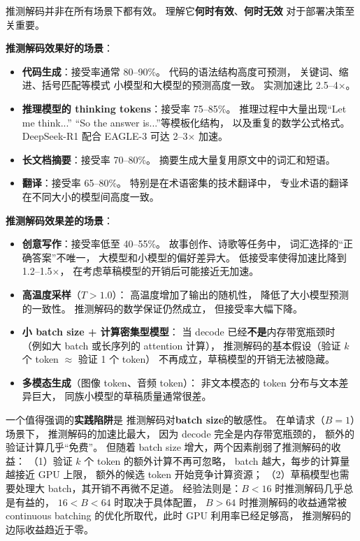 推测解码并非在所有场景下都有效。
理解它\textbf{何时有效}、\textbf{何时无效}
对于部署决策至关重要。

\textbf{推测解码效果好的场景}：
\begin{itemize}[noitemsep]
  \item \textbf{代码生成}：接受率通常 80--90\%。
        代码的语法结构高度可预测，
        关键词、缩进、括号匹配等模式
        小模型和大模型的预测高度一致。
        实测加速比 2.5--4$\times$。
  \item \textbf{推理模型的 thinking tokens}：接受率 75--85\%。
        推理过程中大量出现“Let me think...”
        “So the answer is...”等模板化结构，
        以及重复的数学公式格式。
        DeepSeek-R1 配合 EAGLE-3 可达 2--3$\times$ 加速。
  \item \textbf{长文档摘要}：接受率 70--80\%。
        摘要生成大量复用原文中的词汇和短语。
  \item \textbf{翻译}：接受率 65--80\%。
        特别是在术语密集的技术翻译中，
        专业术语的翻译在不同大小的模型间高度一致。
\end{itemize}

\textbf{推测解码效果差的场景}：
\begin{itemize}[noitemsep]
  \item \textbf{创意写作}：接受率低至 40--55\%。
        故事创作、诗歌等任务中，
        词汇选择的“正确答案”不唯一，
        大模型和小模型的偏好差异大。
        低接受率使得加速比降到 1.2--1.5$\times$，
        在考虑草稿模型的开销后可能接近无加速。
  \item \textbf{高温度采样}（$T > 1.0$）：
        高温度增加了输出的随机性，
        降低了大小模型预测的一致性。
        推测解码的数学保证仍然成立，
        但接受率大幅下降。
  \item \textbf{小 batch size + 计算密集型模型}：
        当 decode 已经\textbf{不是}内存带宽瓶颈时
        （例如大 batch 或长序列的 attention 计算），
        推测解码的基本假设（验证 $k$ 个 token $\approx$ 验证 1 个 token）
        不再成立，草稿模型的开销无法被隐藏。
  \item \textbf{多模态生成}（图像 token、音频 token）：
        非文本模态的 token 分布与文本差异巨大，
        同族小模型的草稿质量通常很差。
\end{itemize}

一个值得强调的\textbf{实践陷阱}是
推测解码对\textbf{batch size}的敏感性。
在单请求（$B = 1$）场景下，
推测解码的加速比最大，
因为 decode 完全是内存带宽瓶颈的，
额外的验证计算几乎“免费”。
但随着 batch size 增大，两个因素削弱了推测解码的收益：
（1）验证 $k$ 个 token 的额外计算不再可忽略，
batch 越大，每步的计算量越接近 GPU 上限，
额外的候选 token 开始竞争计算资源；
（2）草稿模型也需要处理大 batch，其开销不再微不足道。
经验法则是：$B < 16$ 时推测解码几乎总是有益的，
$16 < B < 64$ 时取决于具体配置，
$B > 64$ 时推测解码的收益通常被 continuous batching
的优化所取代，此时 GPU 利用率已经足够高，
推测解码的边际收益趋近于零。


